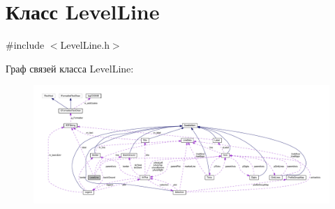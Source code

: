 \hypertarget{class_level_line}{\section{Класс Level\-Line}
\label{class_level_line}
}


{\ttfamily \#include $<$Level\-Line.\-h$>$}



Граф связей класса Level\-Line\-:
\nopagebreak
\begin{figure}[H]
\begin{center}
\leavevmode
\includegraphics[width=350pt]{class_level_line__coll__graph}
\end{center}
\end{figure}
